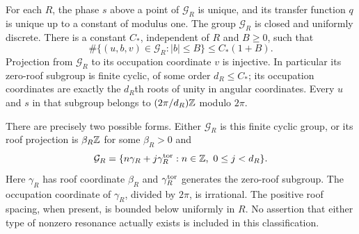 \begin{theorem}
\label{thm:v39-resonance-structure}
For each $R$, the phase $s$ above a point of $\mathcal G_R$ is unique,
and its transfer function $q$ is unique up to a constant of modulus
one. The group $\mathcal G_R$ is closed and uniformly discrete. There
is a constant $C_*$, independent of $R$ and $B\ge0$, such that
\begin{equation}\label{eq:v39-resonance-count}
 \#\{(u,b,v)\in\mathcal G_R:|b|\le B\}\le C_*(1+B).
\end{equation}
Projection from $\mathcal G_R$ to its occupation coordinate $v$ is
injective. In particular its zero-roof subgroup is finite cyclic, of
some order $d_R\le C_*$; its occupation coordinates are exactly the
$d_R$th roots of unity in angular coordinates. Every $u$ and $s$
in that subgroup belongs to $(2\pi/d_R)\mathbb Z$ modulo $2\pi$.

There are precisely two possible forms. Either $\mathcal G_R$ is this
finite cyclic group, or its roof projection is $\beta_R\mathbb Z$ for some
$\beta_R>0$ and
\begin{equation}\label{eq:v39-resonance-structure}
 \mathcal G_R=\{n\gamma_R+j\gamma_R^{\rm tor}:
                 n\in\Z,\ 0\le j<d_R\}.
\end{equation}
Here $\gamma_R$ has roof coordinate $\beta_R$ and
$\gamma_R^{\rm tor}$ generates the zero-roof subgroup. The occupation
coordinate of $\gamma_R$, divided by $2\pi$, is irrational. The positive
roof spacing, when present, is bounded below uniformly in $R$.
No assertion that either type of nonzero resonance actually exists is
included in this classification.
\end{theorem}
